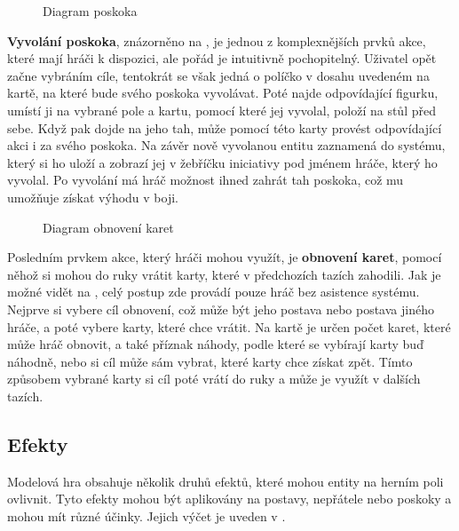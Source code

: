 \begin{figure}[h]
    \centering
    \caption{Diagram poskoka}
    \label{diag:summon}
\end{figure}

\textbf{Vyvolání poskoka}, znázorněno na , je jednou z komplexnějších prvků akce, které mají hráči k dispozici, ale pořád je intuitivně pochopitelný. Uživatel opět začne vybráním cíle, tentokrát se však jedná o políčko v dosahu uvedeném na kartě, na které bude svého poskoka vyvolávat. Poté najde odpovídající figurku, umístí ji na vybrané pole a kartu, pomocí které jej vyvolal, položí na stůl před sebe. Když pak dojde na jeho tah, může pomocí této karty provést odpovídající akci i za svého poskoka. Na závěr nově vyvolanou entitu zaznamená do systému, který si ho uloží a zobrazí jej v žebříčku iniciativy pod jménem hráče, který ho vyvolal. Po vyvolání má hráč možnost ihned zahrát tah poskoka, což mu umožňuje získat výhodu v boji.

\begin{figure}[h]
    \centering
    \caption{Diagram obnovení karet}
    \label{diag:restore_cards}
\end{figure}

Posledním prvkem akce, který hráči mohou využít, je \textbf{obnovení karet}, pomocí něhož si mohou do ruky vrátit karty, které v předchozích tazích zahodili. Jak je možné vidět na , celý postup zde provádí pouze hráč bez asistence systému. Nejprve si vybere cíl obnovení, což může být jeho postava nebo postava jiného hráče, a poté vybere karty, které chce vrátit. Na kartě je určen počet karet, které může hráč obnovit, a také příznak náhody, podle které se vybírají karty buď náhodně, nebo si cíl může sám vybrat, které karty chce získat zpět. Tímto způsobem vybrané karty si cíl poté vrátí do ruky a může je využít v dalších tazích.



\subsection{Efekty}
\label{subsec:design_effects}

Modelová hra obsahuje několik druhů efektů, které mohou entity na herním poli ovlivnit. Tyto efekty mohou být aplikovány na postavy, nepřátele nebo poskoky a mohou mít různé účinky. Jejich výčet je uveden v .

